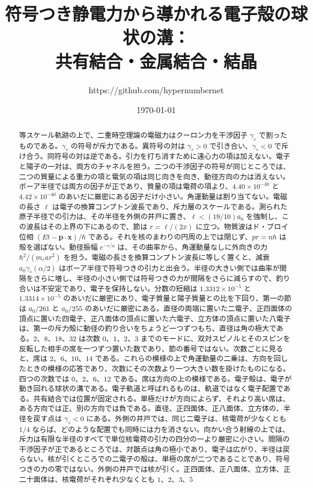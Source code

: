 \documentclass[a4paper]{article}
\title{符号つき静電力から導かれる電子殻の球状の溝：\\
共有結合・金属結合・結晶}
\author{https://github.com/hypernumbernet}
\date{\today}
\begin{document}
\maketitle

\begin{abstract}
等スケール軌跡の上で、二重時空理論の電磁力はクーロン力を干渉因子 \(\gamma_s\) で割ったものである。\(\gamma_s\) の符号が斥力である。異符号の対は \(\gamma_s>0\) で引き合い、\(\gamma_s<0\) で斥け合う。同符号の対は逆である。引力を打ち消すために遠心力の項は加えない。電子と陽子の一対は、両方のチャネルを担う。二つの干渉因子の符号が同じところでは、二つの質量による重力の項と電気の項は同じ向きを向き、動径方向の力は消えない。ボーア半径では両方の因子が正であり、質量の項は電荷の項より、\(4.40\times 10^{-40}\) と \(4.42\times 10^{-40}\) のあいだに厳密にある因子だけ小さい。角運動量は割り当てない。電磁の長さ \(\ell\) は電子の換算コンプトン波長であり、斥力層のスケールである。測られた原子半径での引力は、その半径を外側の井戸に置き、\(\ell<(19/10)a_0\) を強制し、この波長はその上界の下にあるので、節は \(r=\ell/(2x)\) に立つ。物質波はド・ブロイ位相 \((Et-\mathbf{p}\cdot\mathbf{x})/\hbar\) である。それを核のまわりの円周の上では閉じず、\(pr=n\hbar\) は殻を選ばない。動径振幅 \(e^{-r/a}\) は、その曲率から、角運動量なしに外向きの力 \(\hbar^{2}/(m_e a r^{2})\) を担う。電磁の長さを換算コンプトン波長に等しく置くと、減衰 \(a_0\gamma_s(\alpha/2)\) はボーア半径で符号つきの引力と出会う。半径の大きい側では曲率が間隔をさらに増し、半径の小さい側では符号つきの力が間隔をさらに減らすので、釣り合いは不安定であり、電子を保持しない。分数の短縮は \(1.3312\times 10^{-5}\) と \(1.3314\times 10^{-5}\) のあいだに厳密にあり、電子質量と陽子質量との比を下回り、第一の節は \(a_0/261\) と \(a_0/255\) のあいだに厳密にある。直径の両端に置いた二電子、正四面体の頂点に置いた四電子、正八面体の頂点に置いた六電子、立方体の頂点に置いた八電子は、第一の斥力殻に動径の釣り合いをちょうど一つずつもち、直径は角の極大である。\(2\)、\(8\)、\(18\)、\(32\) は次数 \(0\)、\(1\)、\(2\)、\(3\) までのモードに、双対スピノルとそのスピンを反転した相手の席を一つずつ置いた数であり、節の番号ではない。次数ごとに見ると、席は \(2\)、\(6\)、\(10\)、\(14\) である。これらの模様の上で角運動量の二乗は、方向を回したときの模様の応答であり、次数にその次数より一つ大きい数を掛けたものになる。四つの次数では \(0\)、\(2\)、\(6\)、\(12\) である。席は方向の上の模様である。電子殻は、電子が動き回れる球状の溝である。電子軌道と呼ばれるものは、軌道ではなく電子配置である。共有結合では位置が固定される。単極だけが方向によらず、それより高い席は、ある方向では正、別の方向では負である。直径、正四面体、正八面体、立方体の、半径を戻す点は \(\gamma_s<0\) にある。外側の井戸では、同じ二電子は、核電荷が少なくとも \(1/4\) ならば、どのような配置でも同時には力を消さない。向かい合う射線の上では、斥力は有限な半径のすべてで単位核電荷の引力の四分の一より厳密に小さい。間隔の干渉因子が正であるところでは、対蹠点は角の極小であり、電子は広がり、半径は戻らない。核が引くところでの二電子の殻は、単極の席が二つであることであり、符号つきの力の零ではない。外側の井戸では核が引く。正四面体、正八面体、立方体、正二十面体は、核電荷がそれぞれ少なくとも \(1\)、\(2\)、\(3\)、\(5\) 
\end{abstract}
\end{document}
